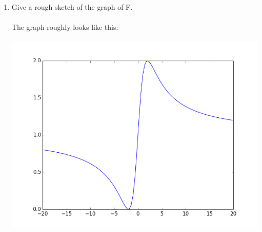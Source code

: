 \documentclass{article}
\begin{document}
\begin{enumerate}[label=(\alph*)]
\item Give a rough sketch of the graph of F. \\\\
The graph roughly looks like this:\\\\
\includegraphics[scale=0.6]{figure_1}
\end{enumerate}

\end{document}
